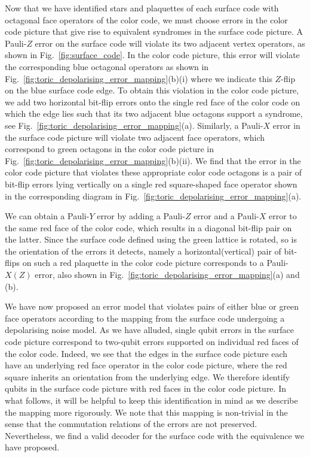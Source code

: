 \documentclass[a4paper,twocolumn,11pt,accepted=2024-12-23]{quantumarticle}
\begin{document}
Now that we have identified stars and plaquettes of each surface code with octagonal face operators of the color code, we must choose errors in the color code picture that give rise to equivalent syndromes in the surface code picture. A Pauli-$Z$ error on the surface code will violate its two adjacent vertex operators, as shown in Fig.~\ref{fig:surface_code}. In the color code picture, this error will violate the corresponding blue octagonal operators as shown in  Fig.~\ref{fig:toric_depolarising_error_mapping}(b)(i) where we indicate this $Z$-flip on the blue surface code edge. To obtain this violation in the color code picture, we add two horizontal bit-flip errors onto the single red face of the color code on which the edge lies such that its two adjacent blue octagons support a syndrome, see Fig.~\ref{fig:toric_depolarising_error_mapping}(a). Similarly, a Pauli-$X$ error in the surface code picture will violate two adjacent face operators, which correspond to green octagons in the color code picture in Fig.~\ref{fig:toric_depolarising_error_mapping}(b)(ii). We find that the error in the color code picture that violates these appropriate color code octagons is a pair of bit-flip errors lying vertically on a single red square-shaped face operator shown in the corresponding diagram in Fig.~\ref{fig:toric_depolarising_error_mapping}(a). 

We can obtain a Pauli-$Y$ error by adding a Pauli-$Z$ error and a Pauli-$X$ error to the same red face of the color code, which results in a diagonal bit-flip pair on the latter. Since the surface code defined using the green lattice is rotated, so is the orientation of the errors it detects, namely a horizontal(vertical) pair of bit-flips on such a red plaquette in the color code picture corresponds to a Pauli-$X(Z)$ error, also shown in Fig.~\ref{fig:toric_depolarising_error_mapping}(a) and (b). 

We have now proposed an error model that violates pairs of either blue or green face operators according to the mapping from the surface code undergoing a depolarising noise model. As we have alluded, single qubit errors in the surface code picture correspond to two-qubit errors supported on individual red faces of the color code. Indeed, we see that the edges in the surface code picture each have an underlying red face operator in the color code picture, where the red square inherits an orientation from the underlying edge. We therefore identify qubits in the surface code picture with red faces in the color code picture. In what follows, it will be helpful to keep this identification in mind as we describe the mapping more rigorously. We note that this mapping is non-trivial in the sense that the commutation relations of the errors are not preserved. Nevertheless, we find a valid decoder for the surface code with the equivalence we have proposed. 
\end{document}
